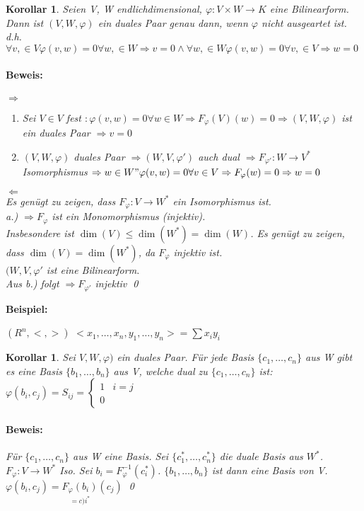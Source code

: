 \documentclass{report}
\newenvironment{beispiel} {
\textbf{Beispiel:}\hfill\break
}{}
\theoremstyle{customrem}
\theoremstyle{customdef}
\newtheorem{korrolar}[definition]{Korollar}
\renewenvironment{proof}{\paragraph{Beweis: }}{\qed}
\theoremstyle{customenv}
\begin{document}
\begin{korrolar}
  Seien V, W endlichdimensional, \(\varphi : V \times W \to K\) eine
  Bilinearform. Dann ist \((V, W, \varphi)\) ein duales Paar genau dann, wenn
  \(\varphi\) nicht ausgeartet ist.\\
  d.h.
  \(\forall v, \in V \varphi(v, w) = 0 \forall w, \in W \Rightarrow v = 0 \land
  \forall w, \in W \varphi(v, w) = 0 \forall v, \in V \Rightarrow w = 0\)
  \begin{proof}
    \(\Rightarrow\)\\
    \begin{enumerate}
      \item{
          Sei \(V \in V\) fest \(: \varphi(v, w) = 0 \forall w \in W
        \Rightarrow F_\varphi(V)(w) = 0 \Rightarrow (V, W, \varphi)\) ist ein
        duales Paar \(\Rightarrow v = 0\)
      }
    \item{
      \((V, W, \varphi)\) duales Paar \(\Rightarrow (W, V, \varphi ')\) auch
        dual \(\Rightarrow F_{\varphi'} : W \to V^*\) Isomorphismus
        \(\Rightarrow w \in W " \varphi(v, w) = 0 \forall v \in V \Rightarrow
        F_{\varphi}(w) = 0 \Rightarrow w = 0\)
      }
    \end{enumerate}
    \(\Leftarrow\)\\
    Es gen\"ugt zu zeigen, dass \(F_{\varphi} : V \to W^*\) ein Isomorphismus
    ist.\\
    a.) \(\Rightarrow F_{\varphi}\)  ist ein Monomorphismus (injektiv).\\
    Insbesondere ist \(\dim(V) \le \dim(W^*) = \dim(W)\). Es gen\"ugt zu zeigen,
    dass \(\dim(V) = \dim(W^*)\), da \(F_{\varphi}\) injektiv ist.\\
    \((W, V, \varphi'\)  ist eine Bilinearform.\\
    Aus b.)  folgt \(\Rightarrow F_{\varphi'}\) injektiv
  \end{proof}
\end{korrolar}

\begin{beispiel}
  \((R^n, <, >)\)
  \(<x_1, \dots, x_n, y_1, \dots, y_n> = \sum x_i y_i\)
\end{beispiel}

\begin{korrolar}
  Sei \(V, W, \varphi)\) ein duales Paar. F\"ur jede Basis
  \(\{c_1, \dots, c_n\}\) aus W gibt es eine Basis \(\{b_1, \dots, b_n\}\) aus
  V, welche dual  zu \(\{c_1, \dots, c_n\}\) ist:
  \(\varphi(b_i, c_j) = S_{ij} = \begin{cases} 1 & i=j\\0 \end{cases}\)
  \begin{proof}
    F\"ur \(\{c_1, \dots, c_n\}\) aus W eine Basis. Sei
    \(\{c_1^*, \dots, c_n^*\}\) die duale Basis aus \(W^*\).\\
    \(F_{\varphi}: V \to W^*\) Iso. Sei \(b_i = F^{-1}_{\varphi}(c_i^*)\).
    \(\{b_1, \dots, b_n\}\) ist dann eine Basis von V.\\
    \(\varphi(b_i, c_j) = \underset{=c)i^*}{F_{\varphi}(b_i)}(c_j)\)
  \end{proof}
\end{korrolar}
\end{document}

